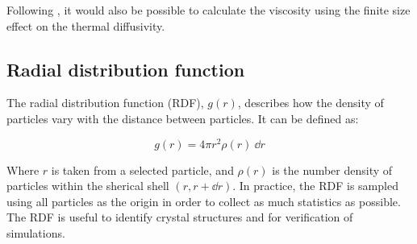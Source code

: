 Following \cite{Yeh2004}, it would also be possible to calculate the viscosity using the finite size effect on the thermal diffusivity.

\subsection{Radial distribution function}
The radial distribution function (RDF), $g(r)$, describes how the density of particles vary with the distance between particles. It can be defined as:

\begin{equation}
	g(r) = 4\pi r^2 \rho(r) \ \dd r
\end{equation}

Where $r$ is taken from a selected particle, and $\rho(r)$ is the number density of particles within the sherical shell $(r, r+\dd r)$. In practice, the RDF is sampled using all particles as the origin in order to collect as much statistics as possible. The RDF is useful to identify crystal structures and for verification of simulations. 


